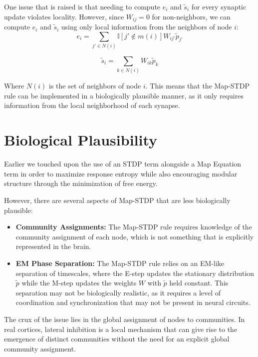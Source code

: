 \documentclass[pdflatex,sn-mathphys-num]{sn-jnl}%
\theoremstyle{thmstyleone}%
\theoremstyle{thmstyletwo}%
\theoremstyle{thmstylethree}%
\begin{document}
One issue that is raised is that needing to compute $e_i$ and $\tilde{s}_i$ for every synaptic update violates locality. However, since $W_{ij}=0$ for non-neighbors, we can compute $e_i$ and $\tilde{s}_i$ using only local information from the neighbors of node $i$:
\begin{equation}
e_i = \sum_{j' \in N(i)} \mathbb{I}[j' \notin m(i)] W_{ij'} \tilde{p}_{j'}
\end{equation}

\begin{equation}
\tilde{s}_i = \sum_{k \in N(i)} W_{ik} \tilde{p}_k
\end{equation}

Where $N(i)$ is the set of neighbors of node $i$. This means that the Map-STDP rule can be implemented in a biologically plausible manner, as it only requires information from the local neighborhood of each synapse.

\section{Biological Plausibility}\label{sec11}

Earlier we touched upon the use of an STDP term alongside a Map Equation term in order to maximize response entropy while also encouraging modular structure through the minimization of free energy.

However, there are several aspects of Map-STDP that are less biologically plausible:\begin{itemize}
    \item \textbf{Community Assignments:} The Map-STDP rule requires knowledge of the community assignment of each node, which is not something that is explicitly represented in the brain.
    \item \textbf{EM Phase Separation:} The Map-STDP rule relies on an EM-like separation of timescales, where the E-step updates the stationary distribution $\tilde{p}$ while the M-step updates the weights $W$ with $\tilde{p}$ held constant. This separation may not be biologically realistic, as it requires a level of coordination and synchronization that may not be present in neural circuits.
\end{itemize}

The crux of the issue lies in the global assignment of nodes to communities. In real cortices, lateral inhibition is a local mechanism that can give rise to the emergence of distinct communities without the need for an explicit global community assignment. 
\end{document}
